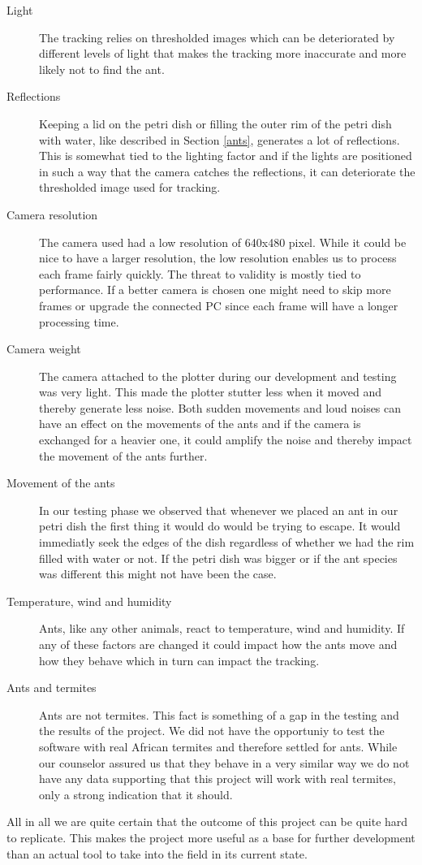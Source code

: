 \begin{description}
\item[Light] The tracking relies on thresholded images which can be deteriorated by different levels of light that makes the tracking more inaccurate and more likely not to find the ant. \\

\item[Reflections] Keeping a lid on the petri dish or filling the outer rim of the petri dish with water, like described in Section \ref{ants}, generates a lot of reflections. This is somewhat tied to the lighting factor and if the lights are positioned in such a way that the camera catches the reflections, it can deteriorate the thresholded image used for tracking. \\

\item[Camera resolution] The camera used had a low resolution of 640x480 pixel. While it could be nice to have a larger resolution, the low resolution enables us to process each frame fairly quickly. The threat to validity is mostly tied to performance. If a better camera is chosen one might need to skip more frames or upgrade the connected PC since each frame will have a longer processing time. \\

\item[Camera weight] The camera attached to the plotter during our development and testing was very light. This made the plotter stutter less when it moved and thereby generate less noise. Both sudden movements and loud noises can have an effect on the movements of the ants and if the camera is exchanged for a heavier one, it could amplify the noise and thereby impact the movement of the ants further. \\

\item[Movement of the ants] In our testing phase we observed that whenever we placed an ant in our petri dish the first thing it would do would be trying to escape. It would immediatly seek the edges of the dish regardless of whether we had the rim filled with water or not. If the petri dish was bigger or if the ant species was different this might not have been the case. \\

\item[Temperature, wind and humidity] Ants, like any other animals, react to temperature, wind and humidity. If any of these factors are changed it could impact how the ants move and how they behave which in turn can impact the tracking. \\  

\item[Ants and termites] Ants are not termites. This fact is something of a gap in the testing and the results of the project. We did not have the opportuniy to test the software with real African termites and therefore settled for ants. While our counselor assured us that they behave in a very similar way we do not have any data supporting that this project will work with real termites, only a strong indication that it should.

\end{description}

All in all we are quite certain that the outcome of this project can be quite hard to replicate. This makes the project more useful as a base for further development than an actual tool to take into the field in its current state. 
